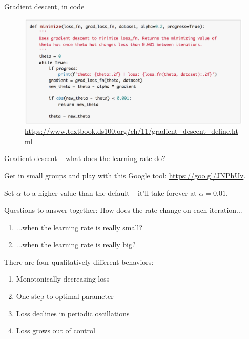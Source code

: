 \documentclass[aspectratio=169]{beamer}
\begin{document}
\begin{frame}{Gradient descent, in code}

%
%
%

\begin{figure}
\includegraphics[width=1.\textwidth]{grad_desc}
\caption*{\url{https://www.textbook.ds100.org/ch/11/gradient_descent_define.html}}
\end{figure}

\end{frame}

\begin{frame}{Gradient descent -- what does the learning rate do?}

Get in small groups and play with this Google tool: \href{https://goo.gl/JNPhUv}{https://goo.gl/JNPhUv}.

\vspace{5mm}

Set $\alpha$ to a higher value than the default -- it'll take forever at $\alpha = 0.01$.  
\vspace{5mm}

Questions to answer together:  How does the rate change on each iteration...
\begin{enumerate}
\item ...when the learning rate is really small?
\item ...when the learning rate is really big?
\end{enumerate}


\pause
\vspace{5mm}
There are four qualitatively different behaviors:
\begin{enumerate}
\item Monotonically decreasing loss
\item One step to optimal parameter
\item Loss declines in periodic oscillations
\item Loss grows out of control
\end{enumerate}

\end{frame}
\end{document}
